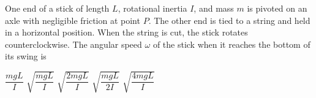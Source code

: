 \documentclass{../../oss-apphys-exam}
\newcounter{lastmc}
\begin{document}
\begin{multicols*}{2}
\begin{questions}
    \question One end of a stick of length $L$, rotational inertia $I$, and
    mass $m$ is pivoted on an axle with negligible friction at point $P$. The
    other end is tied to a string and held in a horizontal position. When the
    string is cut, the stick rotates counterclockwise. The angular speed
    $\omega$ of the stick when it reaches the bottom of its swing is
    \begin{choices}
      \choice $\dfrac{mgL}I$
      \choice $\sqrt{\dfrac{mgL}I}$
      \choice $\sqrt{\dfrac{2mgL}I}$
      \choice $\sqrt{\dfrac{mgL}{2I}}$
      \choice $\sqrt{\dfrac{4mgL}I}$
    \end{choices}
  \end{questions}
  \setcounter{lastmc}{\value{question}}
\end{multicols*}
\newpage



\begin{center}
\end{center}
\end{document}
